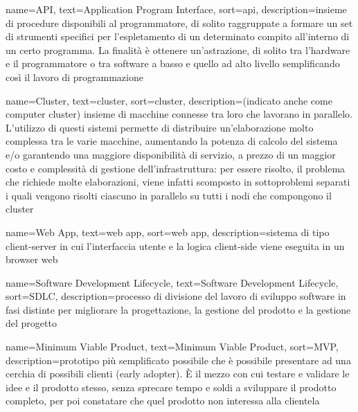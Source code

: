 
\renewcommand{\acronymname}{Acronimi e abbreviazioni}

{
    name=API,
    text=Application Program Interface,
    sort=api,
    description={insieme di procedure disponibili al programmatore, di solito raggruppate a formare un set di strumenti specifici per l'espletamento di un determinato compito all'interno di un certo programma. La finalità è ottenere un'astrazione, di solito tra l'hardware e il programmatore o tra software a basso e quello ad alto livello semplificando così il lavoro di programmazione}
}

{
    name=Cluster,
    text=cluster,
    sort=cluster,
    description={(indicato anche come computer cluster) insieme di macchine connesse tra loro che lavorano in parallelo.
    L'utilizzo di questi sistemi permette di distribuire un'elaborazione molto complessa tra le varie macchine, aumentando la potenza di calcolo del sistema e/o garantendo una maggiore disponibilità di servizio, a prezzo di un maggior costo e complessità di gestione dell'infrastruttura: per essere risolto, il problema che richiede molte elaborazioni, viene infatti scomposto in sottoproblemi separati i quali vengono risolti ciascuno in parallelo su tutti i nodi che compongono il cluster}
}

{
	name=Web App,
	text=web app,
	sort=web app,
	description={sistema di tipo client-server in cui l'interfaccia utente e la logica client-side viene eseguita in un browser web}
}

{
	name=Software Development Lifecycle,
	text=Software Development Lifecycle,
	sort=SDLC,
	description={processo di divisione del lavoro di sviluppo software in fasi distinte per migliorare la progettazione, la gestione del prodotto e la gestione del progetto}
}

{
	name=Minimum Viable Product,
	text=Minimum Viable Product,
	sort=MVP,
	description={prototipo più semplificato possibile che è possibile presentare ad una cerchia di possibili clienti (early adopter). È il mezzo con cui testare e validare le idee e il prodotto stesso, senza sprecare tempo e soldi a sviluppare il prodotto completo, per poi constatare che quel prodotto non interessa alla clientela}
}

